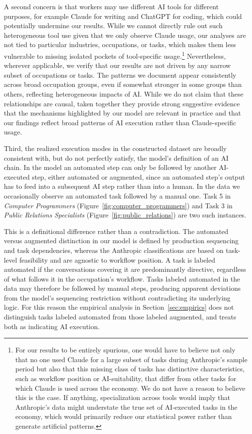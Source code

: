 A second concern is that workers may use different AI tools for different purposes, for example Claude for writing and ChatGPT for coding, which could potentially undermine our results.
While we cannot directly rule out such heterogeneous tool use given that we only observe Claude usage, our analyses are not tied to particular industries, occupations, or tasks, which makes them less vulnerable to missing isolated pockets of tool-specific usage.\footnote{
For our results to be entirely spurious, one would have to believe not only that no one used Claude for a large subset of tasks during Anthropic's sample period but also that this missing class of tasks has distinctive characteristics, such as workflow position or AI-suitability, that differ from other tasks for which Claude is used across the economy.
We do not have a reason to believe this is the case.
If anything, specialization across tools would imply that Anthropic's data might understate the true set of AI-executed tasks in the economy, which would primarily reduce our statistical power rather than generate artificial patterns.
}
Nevertheless, wherever applicable, we verify that our results are not driven by any narrow subset of occupations or tasks.
The patterns we document appear consistently across broad occupation groups, even if somewhat stronger in some groups than others, reflecting heterogeneous impacts of AI.
While we do not claim that these relationships are causal, taken together they provide strong suggestive evidence that the mechanisms highlighted by our model are relevant in practice and that our findings reflect broad patterns of AI execution rather than Claude-specific usage.

Third, the realized execution modes in the constructed dataset are broadly consistent with, but do not perfectly satisfy, the model's definition of an AI chain.
In the model an automated step can only be followed by another AI-executed step, either automated or augmented, since an automated step's output has to feed into a subsequent AI step rather than into a human.
In the data we occasionally observe an automated task followed by a manual one.
Task 5 in \textit{Computer Programmers} (Figure~\ref{fig:computer_programmers}) and Task 3 in \textit{Public Relations Specialists} (Figure~\ref{fig:public_relations}) are two such instances.

This is a definitional difference rather than a contradiction.
The automated versus augmented distinction in our model is defined by production sequencing and task dependencies, whereas the Anthropic classifications are based on task-level feasibility and are agnostic to workflow position.
A task is labeled automated if the conversations covering it are predominantly directive, regardless of what follows it in the occupation's workflow.
Tasks labeled automated in the data may therefore be followed by manual steps, producing apparent deviations from the model's sequencing restriction without contradicting its underlying logic.
For this reason the empirical analysis in Section~\ref{sec:empirics} does not distinguish tasks labeled automated from those labeled augmented, and treats both as indicating AI execution.


